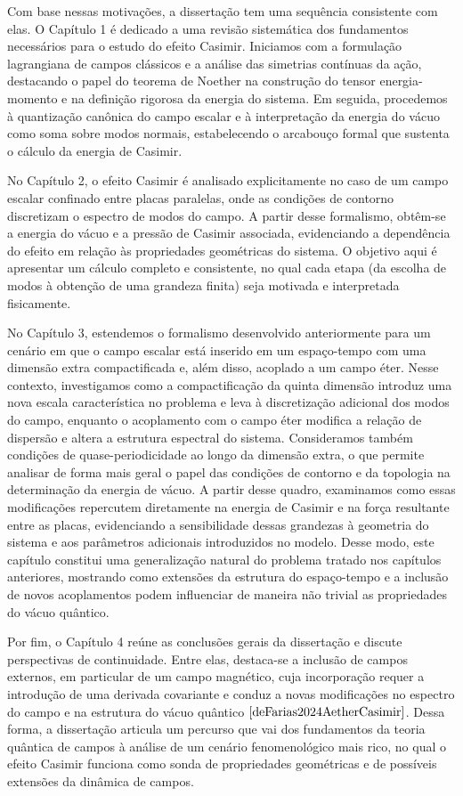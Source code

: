 Com base nessas motivações, a dissertação tem uma sequência consistente com elas. O Capítulo 1 é dedicado a uma revisão sistemática dos fundamentos necessários para o estudo do efeito Casimir. Iniciamos com a formulação lagrangiana de campos clássicos e a análise das simetrias contínuas da ação, destacando o papel do teorema de Noether na construção do tensor energia-momento e na definição rigorosa da energia do sistema. Em seguida, procedemos à quantização canônica do campo escalar e à interpretação da energia do vácuo como soma sobre modos normais, estabelecendo o arcabouço formal que sustenta o cálculo da energia de Casimir.

No Capítulo 2, o efeito Casimir é analisado explicitamente no caso de um campo escalar confinado entre placas paralelas, onde as condições de contorno discretizam o espectro de modos do campo. A partir desse formalismo, obtêm-se a energia do vácuo e a pressão de Casimir associada, evidenciando a dependência do efeito em relação às propriedades geométricas do sistema. O objetivo aqui é apresentar um cálculo completo e consistente, no qual cada etapa (da escolha de modos à obtenção de uma grandeza finita) seja motivada e interpretada fisicamente.

No Capítulo 3, estendemos o formalismo desenvolvido anteriormente para um cenário em que o campo escalar está inserido em um espaço-tempo com uma dimensão extra compactificada e, além disso, acoplado a um campo éter. Nesse contexto, investigamos como a compactificação da quinta dimensão introduz uma nova escala característica no problema e leva à discretização adicional dos modos do campo, enquanto o acoplamento com o campo éter modifica a relação de dispersão e altera a estrutura espectral do sistema. Consideramos também condições de quase-periodicidade ao longo da dimensão extra, o que permite analisar de forma mais geral o papel das condições de contorno e da topologia na determinação da energia de vácuo. A partir desse quadro, examinamos como essas modificações repercutem diretamente na energia de Casimir e na força resultante entre as placas, evidenciando a sensibilidade dessas grandezas à geometria do sistema e aos parâmetros adicionais introduzidos no modelo. Desse modo, este capítulo constitui uma generalização natural do problema tratado nos capítulos anteriores, mostrando como extensões da estrutura do espaço-tempo e a inclusão de novos acoplamentos podem influenciar de maneira não trivial as propriedades do vácuo quântico.

Por fim, o Capítulo 4 reúne as conclusões gerais da dissertação e discute perspectivas de continuidade. Entre elas, destaca-se a inclusão de campos externos, em particular de um campo magnético, cuja incorporação requer a introdução de uma derivada covariante e conduz a novas modificações no espectro do campo e na estrutura do vácuo quântico $\cite{deFarias2024AetherCasimir}$. Dessa forma, a dissertação articula um percurso que vai dos fundamentos da teoria quântica de campos à análise de um cenário fenomenológico mais rico, no qual o efeito Casimir funciona como sonda de propriedades geométricas e de possíveis extensões da dinâmica de campos.
